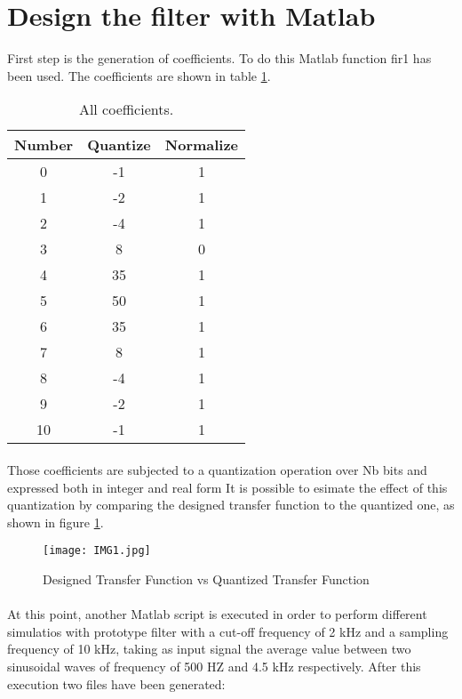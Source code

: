 \section{Design the filter with Matlab}

First step is the generation of coefficients. To do this Matlab function fir1 has been used.
The coefficients are shown in table \ref{tab:1}. %

\begin{table}[ht]
\centering
\begin{tabular}{c|c|c}
\toprule
Number & Quantize & Normalize \\
\midrule
0 & -1 & 1 \\
1 & -2 & 1 \\
2 & -4 & 1 \\
3 & 8 & 0 \\
4 & 35 & 1 \\
5 & 50 & 1 \\
6 & 35 & 1 \\
7 & 8 & 1 \\
8 & -4 & 1 \\
9 & -2 & 1 \\
10 & -1 & 1 \\
\bottomrule
\end{tabular}
\caption{All coefficients.}
\label{tab:1}
\end{table}
\paragraph{}
Those coefficients are subjected to a quantization operation over Nb bits and expressed both in integer and real form
It is possible to esimate the effect of this quantization by comparing the designed transfer function to the quantized one, as shown in figure \ref{fig:1}.
\begin{figure}[!ht]
	\caption{Designed Transfer Function vs Quantized Transfer Function}
	\label{fig:1}
	\texttt{[image: IMG1.jpg]}
	\centering
\end{figure}

\paragraph{}
At this point, another Matlab script is executed in order to perform
different simulatios with prototype filter with a cut-off frequency of 2 kHz and a sampling frequency of 10 kHz, taking as 
input signal the average value between two sinusoidal waves of frequency of 500 HZ and 4.5 kHz respectively.
After this execution two files have been generated:

